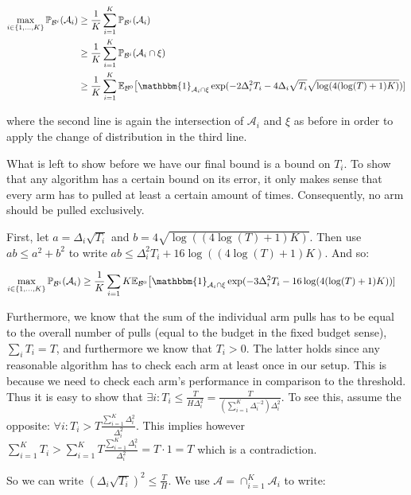 \documentclass[12pt,]{article}
\begin{document}
\begin{align*}
\max_{i \in \{1,\dots,K\}} \mathbb{P}_{\mathcal{B}^i}(\mathcal{A}_i) & \geq \frac{1}{K} \sum_{i=1}^{K} \mathbb{P}_{\mathcal{B}^i}(\mathcal{A}_i) \\
& \geq \frac{1}{K} \sum_{i=1}^{K} \mathbb{P}_{\mathcal{B}^i}(\mathcal{A}_i \cap \xi) \\
& \geq \frac{1}{K} \sum_{i=1}^{K} \mathbb{E}_{\mathcal{B}^0} \big[\mathbbm{1}_{\mathcal{A}_i \cap \xi} \exp (- 2 \Delta_i^2 T_i - 4 \Delta_i \sqrt{T_i} \sqrt{\log(4(\log(T)+1)K)}) ]
\end{align*}

where the second line is again the intersection of \(\mathcal{A}_i\) and
\(\xi\) as before in order to apply the change of distribution in the
third line.

What is left to show before we have our final bound is a bound on
\(T_i\). To show that any algorithm has a certain bound on its error, it
only makes sense that every arm has to pulled at least a certain amount
of times. Consequently, no arm should be pulled exclusively.

First, let \(a = \Delta_i \sqrt{T_i}\) and
\(b = 4\sqrt{\log((4\log(T)+1)K)}\). Then use \(ab \leq a^2 + b^2\) to
write \(ab \leq \Delta_i^2 T_i + 16\log((4\log(T)+1)K)\). And so:

\begin{align*}
\max_{i \in \{1,\dots,K\}} \mathbb{P}_{\mathcal{B}^i}(\mathcal{A}_i) & \geq \frac{1}{K} \sum_{i=1}{K} \mathbb{E}_{\mathcal{B}^0} \big[\mathbbm{1}_{\mathcal{A}_i \cap \xi} \exp (- 3 \Delta_i^2 T_i - 16 \log(4(\log(T)+1)K)) ]
\end{align*}

Furthermore, we know that the sum of the individual arm pulls has to be
equal to the overall number of pulls (equal to the budget in the fixed
budget sense), \(\sum_i T_i = T\), and furthermore we know that
\(T_i>0\). The latter holds since any reasonable algorithm has to check
each arm at least once in our setup. This is because we need to check
each arm's performance in comparison to the threshold. Thus it is easy
to show that
\(\exists i: T_i \leq \frac{T}{H \Delta_i^2} = \frac{T}{(\sum_{i=1}^{K} \Delta_i^{-2}) \Delta_i^2}\).
To see this, assume the opposite:
\(\forall i: T_i > T \frac{\sum_{i=1}^K \Delta_i^2}{\Delta_i^2}\). This
implies however
\(\sum_{i=1}^K T_i > \sum_{i=1}^K T \frac{\sum_{i=1}^K \Delta_i^2}{\Delta_i^2} = T \cdot 1 = T\)
which is a contradiction.

So we can write \((\Delta_i \sqrt{T_i})^2 \leq \frac{T}{H}\). We use
\(\mathcal{A} = \cap_{i=1}^K \mathcal{A}_i\) to write:
\end{document}
